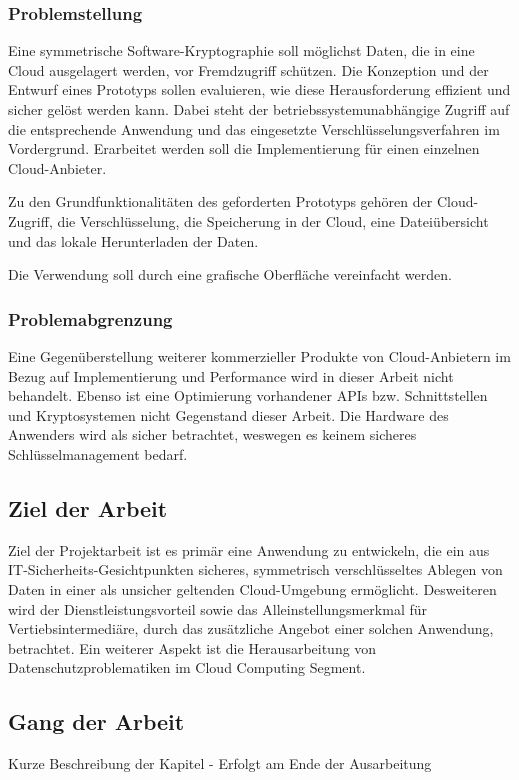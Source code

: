 \documentclass[12pt,a4paper,bibliography=totocnumbered,listof=totocnumbered]{scrartcl}
\begin{document}
\subsubsection{Problemstellung}
Eine symmetrische Software-Kryptographie soll möglichst Daten, die in eine Cloud ausgelagert werden,  vor Fremdzugriff schützen. Die Konzeption und der Entwurf eines Prototyps sollen evaluieren, wie diese Herausforderung effizient und sicher gelöst werden kann. Dabei steht der betriebssystemunabhängige Zugriff auf die entsprechende Anwendung und das eingesetzte Verschlüsselungsverfahren im Vordergrund. Erarbeitet werden soll die Implementierung für einen einzelnen Cloud-Anbieter. 

Zu den Grundfunktionalitäten des geforderten Prototyps gehören der Cloud-Zugriff, die Verschlüsselung, die Speicherung in der Cloud, eine Dateiübersicht und das lokale Herunterladen der Daten.

Die Verwendung soll durch eine grafische Oberfläche vereinfacht werden.

\subsubsection{Problemabgrenzung}
Eine Gegenüberstellung weiterer kommerzieller Produkte von Cloud-Anbietern im Bezug auf Implementierung und Performance wird in dieser Arbeit nicht behandelt. Ebenso ist eine Optimierung vorhandener APIs bzw. Schnittstellen und Kryptosystemen nicht Gegenstand dieser Arbeit. Die Hardware des Anwenders wird als sicher betrachtet, weswegen es keinem sicheres Schlüsselmanagement bedarf.

\subsection{Ziel der Arbeit}
Ziel der Projektarbeit ist es primär eine Anwendung zu entwickeln, die ein aus IT-Sicherheits-Gesichtpunkten sicheres, symmetrisch verschlüsseltes Ablegen von Daten in einer als unsicher geltenden Cloud-Umgebung ermöglicht. Desweiteren wird der Dienstleistungsvorteil sowie das Alleinstellungsmerkmal für Vertiebsintermediäre, durch das zusätzliche Angebot einer solchen Anwendung, betrachtet. Ein weiterer Aspekt ist die Herausarbeitung von Datenschutzproblematiken im Cloud Computing Segment.

\subsection{Gang der Arbeit}
Kurze Beschreibung der Kapitel - Erfolgt am Ende der Ausarbeitung
\pagebreak
\end{document}
